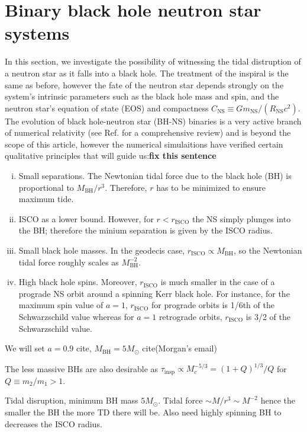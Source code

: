 \documentclass[amsmath,amssymb,aps,floats,amsfonts,notitlepage,superscriptaddress,eqsecnum,nofootinbib,10pt]{revtex4-1}
\begin{document}
\section{Binary black hole neutron star systems}
In this section, we investigate the possibility of witnessing the tidal distruption of a neutron star as it falls into a black hole. 
The treatment of the inspiral is the same as before, however the fate of the neutron star depends strongly on the system's intrinsic parameters
such as the black hole mass and spin, and the neutron star's equation of state (EOS) and compactness $C_\text{NS}\equiv G m_\text{NS}/(R_\text{NS}c^2)$. 
The evolution of black hole-neutron star (BH-NS) binaries is a very active branch of numerical relativity
(see Ref. \cite{Shibata:2011jka} for a comprehensive review) and is beyond the scope of this article, however the numerical simulaitions
have verified certain qualitative principles that will guide us:{\bf fix this sentence}
%
\begin{enumerate}[(i)]
 \item Small separations. The Newtonian tidal force due to the black hole (BH) is proportional to $M_\text{BH}/r^3$. Therefore, $r$ has to be
 minimized to ensure maximum tide.
 \item ISCO as a lower bound. However, for $r< r_\text{ISCO}$ the NS simply plunges into the BH; therefore the minium separation is given by the ISCO radius.
 \item Small black hole masses. In the geodecis case, $r_\text{ISCO} \propto M_\text{BH}$, so the Newtonian tidal force roughly scales as $M_\text{BH}^{-2}$. 
 \item High black hole spins. Moreover, $r_\text{ISCO}$ is much smaller in the case of a prograde NS orbit around a spinning Kerr black hole.
 For instance, for the maximum spin value of $a=1$, $r_\text{ISCO}$ for prograde orbits is 1/6th of the Schwarzschild value whereas for
 $a=1$ retrograde orbits, $r_\text{ISCO}$ is 3/2 of the Schwarzschild value.
\end{enumerate}

We will set $a=0.9$ cite, $M_\text{BH} =5 M_\odot$ cite(Morgan's email)

The less massive BHs are also desirable as 
 $\tau_\text{insp} \propto M_c^{-5/3} = (1+Q)^{1/3}/Q$ for $Q\equiv m_2/m_1 > 1$.

Tidal disruption, minimum BH mass $5 M_\odot$. Tidal force $\sim M/r^3 \sim M^{-2}$ hence the smaller the BH the more TD there will be.
Also need highly spinning BH to decreases the ISCO radius.
 
 

%


 
 
 
 
 
 
 
\end{document}
